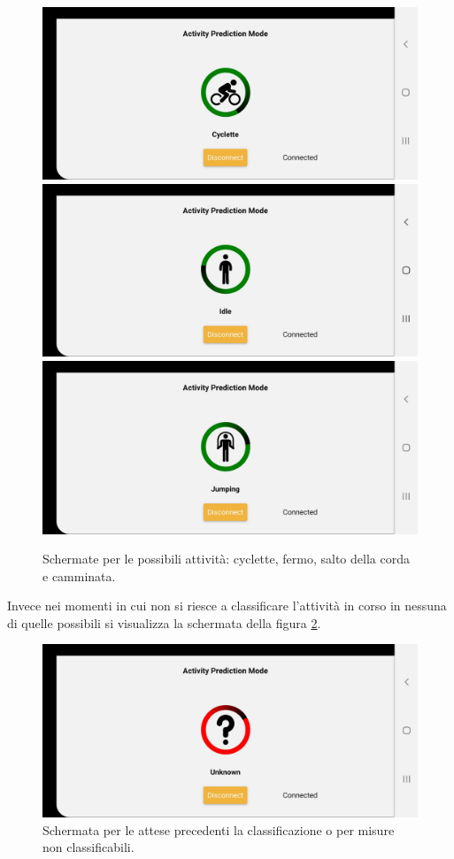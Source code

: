 \begin{figure}[tbh]
	\centering
	\includegraphics[width=0.4\linewidth]{./ImageFiles/cyclette}
	\includegraphics[width=0.4\linewidth]{./ImageFiles/idle}
	\includegraphics[width=0.4\linewidth]{./ImageFiles/jumping}
	\caption{Schermate per le possibili attività: cyclette, fermo, salto della corda e camminata.}
	\label{fig:attivitafisica}
\end{figure}

Invece nei momenti in cui non si riesce a classificare l'attività in corso in nessuna di quelle possibili si visualizza la schermata della figura \ref{fig:attesa}.

\begin{figure}[tbh]
	\centering
	\includegraphics[width=0.4\linewidth]{./ImageFiles/unknown}
	\caption{Schermata per le attese precedenti la classificazione o per misure non classificabili.}
	\label{fig:attesa}
\end{figure}

